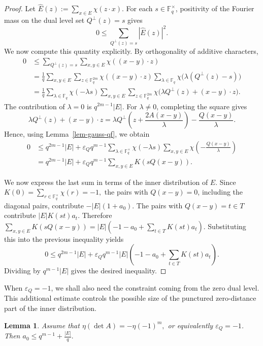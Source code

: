 \documentclass[11pt]{article}
\newtheorem{lemma}[theorem]{Lemma}
\newcommand{\F}{\mathbb{F}}
\newcommand{\1}{\mathbf{1}}
\begin{document}
\begin{proof}
	Let $\widehat{E}(z):=\sum_{x\in E}\chi(z\cdot x).$
	For each \(s\in\F_q^\times\), positivity of the Fourier mass on the dual
	level set \(Q^\perp(z)=s\) gives
	\[
	0
	\le
	\sum_{Q^\perp(z)=s}|\widehat{E}(z)|^2.
	\]
	We now compute this quantity explicitly. By orthogonality of additive
	characters,
	\begin{align*}
		0
		&\le
		\sum_{Q^\perp(z)=s}
		\sum_{x,y\in E}\chi((x-y)\cdot z) \\
		&=
		\frac1q
		\sum_{x,y\in E}
		\sum_{z\in\F_q^{2m}}
		\chi((x-y)\cdot z)
		\sum_{\lambda\in\F_q}
		\chi\bigl(\lambda(Q^\perp(z)-s)\bigr) \\
		&=
		\frac1q
		\sum_{\lambda\in\F_q}
		\chi(-\lambda s)
		\sum_{x,y\in E}
		\sum_{z\in\F_q^{2m}}
		\chi\bigl(\lambda Q^\perp(z)+(x-y)\cdot z\bigr).
	\end{align*}
	The contribution of \(\lambda=0\) is $q^{2m-1}|E|.$
	For \(\lambda\ne0\), completing the square gives
	\[
	\lambda Q^\perp(z)+(x-y)\cdot z
	=
	\lambda Q^\perp\left(z+\frac{2A(x-y)}{\lambda}\right)
	-
	\frac{Q(x-y)}{\lambda}.
	\]
	Hence, using Lemma~\ref{lem-gauss-qf}, we obtain
	\begin{align*}
		0
		&\le
		q^{2m-1}|E|
		+
		\varepsilon_Q q^{m-1}
		\sum_{\lambda\in\F_q^\times}
		\chi(-\lambda s)
		\sum_{x,y\in E}
		\chi\left(-\frac{Q(x-y)}{\lambda}\right) \\
		&=
		q^{2m-1}|E|
		+
		\varepsilon_Q q^{m-1}
		\sum_{x,y\in E}
		K(sQ(x-y)).
	\end{align*}
	
	We now express the last sum in terms of the inner distribution of \(E\).
	Since $K(0)=\sum_{r\in\F_q^\times}\chi(r)=-1,$
	the pairs with \(Q(x-y)=0\), including the diagonal pairs, contribute $-|E|(1+a_0).$
	The pairs with \(Q(x-y)=t\in T\) contribute $|E|K(st)a_t.$
	Therefore $\sum_{x,y\in E}K(sQ(x-y))
	=
	|E|
	\left(
	-1-a_0+\sum_{t\in T}K(st)a_t
	\right).$
	Substituting this into the previous inequality yields
	\[
	0
	\le
	q^{2m-1}|E|
	+
	\varepsilon_Q q^{m-1}|E|
	\left(
	-1-a_0+\sum_{t\in T}K(st)a_t
	\right).
	\]
	Dividing by \(q^{m-1}|E|\) gives the desired inequality.
\end{proof}

When \(\varepsilon_Q=-1\), we shall also need the constraint coming from the
zero dual level. This additional estimate controls the possible size of the
punctured zero-distance part of the inner distribution.

\begin{lemma}\label{lem-9}
	Assume that $\eta(\det A)=-\eta(-1)^m,$
	or equivalently \(\varepsilon_Q=-1\). Then $a_0\le q^{m-1}+\frac{|E|}{q}.$
\end{lemma}
\end{document}

